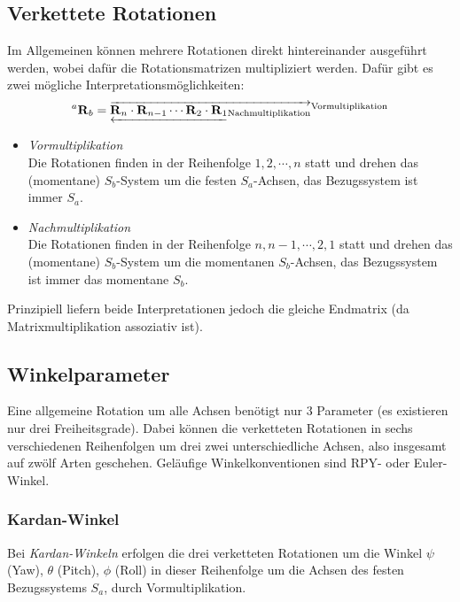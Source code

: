 		\subsection{Verkettete Rotationen}
			Im Allgemeinen können mehrere Rotationen direkt hintereinander ausgeführt werden, wobei dafür die Rotationsmatrizen multipliziert werden. Dafür gibt es zwei mögliche Interpretationsmöglichkeiten:
			\begin{equation*}
				\prescript{a}{}{\boldsymbol{\mathrm{R}}}_b = \overrightarrow{\underleftarrow{\boldsymbol{\mathrm{R}}_n \cdot \boldsymbol{\mathrm{R}}_{n - 1} \cdots \boldsymbol{\mathrm{R}}_2 \cdot \boldsymbol{\mathrm{R}}_1}_\text{Nachmultiplikation}}^\text{Vormultiplikation}
			\end{equation*}
			\begin{itemize}
				\item \emph{Vormultiplikation} \\ Die Rotationen finden in der Reihenfolge \( 1, 2, \cdots, n \) statt und drehen das (momentane) \(S_b\)-System um die festen \(S_a\)-Achsen, das Bezugssystem ist immer \(S_a\).
				\item \emph{Nachmultiplikation} \\ Die Rotationen finden in der Reihenfolge \( n, n - 1, \cdots, 2, 1 \) statt und drehen das (momentane) \(S_b\)-System um die momentanen \(S_b\)-Achsen, das Bezugssystem ist immer das momentane \(S_b\).
			\end{itemize}
			Prinzipiell liefern beide Interpretationen jedoch die gleiche Endmatrix (da Matrixmultiplikation assoziativ ist).

		\subsection{Winkelparameter}
			Eine allgemeine Rotation um alle Achsen benötigt nur \(3\) Parameter (es existieren nur drei Freiheitsgrade). Dabei können die verketteten Rotationen in sechs verschiedenen Reihenfolgen um drei \bzw zwei unterschiedliche Achsen, also insgesamt auf zwölf Arten geschehen. Geläufige Winkelkonventionen sind \zB RPY- oder Euler-Winkel.

			\subsubsection{Kardan-Winkel}
				Bei \emph{Kardan-Winkeln} erfolgen die drei verketteten Rotationen um die Winkel \(\psi\) (Yaw), \(\theta\) (Pitch), \(\phi\) (Roll) in dieser Reihenfolge um die Achsen des festen Bezugssystems \(S_a\), \dh durch Vormultiplikation.
			
